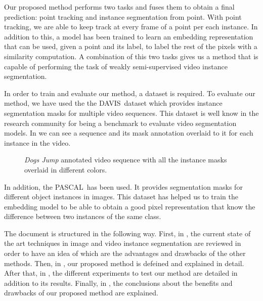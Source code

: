 Our proposed method performs two tasks and fuses them to obtain a final prediction: point tracking and instance segmentation from point.
With point tracking, we are able to keep track at every frame of a point per each instance.
In addition to this, a model has been trained to learn an embedding representation that can be used, given a point and its label, to label the rest of the pixels with a similarity computation.
A combination of this two tasks gives us a method
that is capable of performing the task of weakly semi-supervised video instance segmentation.

In order to train and evaluate our method, a dataset is required.
To evaluate our method, we have used the the DAVIS~\davisboth dataset which provides instance segmentation masks for multiple video sequences.
This dataset is well know in the research community for being a benchmark to evaluate video segmentation models.
In  we can see a sequence and its mask annotation overlaid to it for each instance in the video.

\begin{figure}[h]
  \centering
  \caption{\textit{Dogs Jump} annotated video sequence with all the instance masks overlaid in different colors. }
  \label{fig:intro:davis}
\end{figure}

In addition, the PASCAL~\pascal has been used. It provides segmentation masks for different object instances in images. This dataset has helped us to train the embedding model to be able to obtain a good pixel representation that know the difference between two instances of the same class.

The document is structured in the following way. First, in , the current state of the art techniques in image and video instance segmentation are reviewed in order to have an idea of which are the advantages and drawbacks of the other methods.
Then, in , our proposed method is defeined and explained in detail.
After that, in , the different experiments to test our method are detailed in addition to its results.
Finally, in , the conclusions about the benefits and drawbacks of our proposed method are explained.





